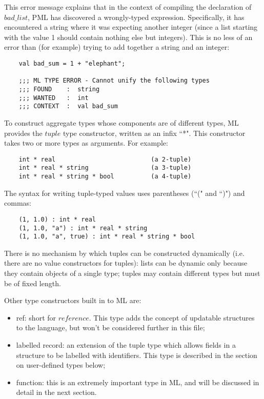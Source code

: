 This error message explains that in the context of compiling the
declaration of $bad\_list$, PML has discovered a wrongly-typed
expression. Specifically, it has encountered a string where it was
expecting another integer (since a list starting with the value 1 should
contain nothing else but integers). This is no less of an error than
(for example) trying to add together a string and an integer:
\begin{verbatim}
    val bad_sum = 1 + "elephant";

    ;;; ML TYPE ERROR - Cannot unify the following types
    ;;; FOUND    :  string
    ;;; WANTED   :  int
    ;;; CONTEXT  :  val bad_sum
\end{verbatim}

To construct aggregate types whose components are of different types, ML
provides the $tuple$ type constructor, written as an infix ``*". This
constructor takes two or more types as arguments. For example:
\begin{verbatim}
    int * real                          (a 2-tuple)
    int * real * string                 (a 3-tuple)
    int * real * string * bool          (a 4-tuple)
\end{verbatim}

The syntax for writing tuple-typed values uses parentheses (``(" and ``)")
and commas:
\begin{verbatim}
    (1, 1.0) : int * real
    (1, 1.0, "a") : int * real * string
    (1, 1.0, "a", true) : int * real * string * bool
\end{verbatim}

There is no mechanism by which tuples can be constructed dynamically
(i.e. there are no value constructors for tuples): lists can be dynamic
only because they contain objects of a single type; tuples may contain
different types but must be of fixed length.

Other type constructors built in to ML are:
\begin{itemize}
\item    ref:
        short for $reference$. This type adds the concept of updatable
        structures to the language, but won't be considered further in
        this file;

\item    labelled record:
        an extension of the tuple type which allows fields in a
        structure to be labelled with identifiers. This type is
        described in the section on user-defined types below;

\item    function:
        this is an extremely important type in ML, and will be discussed
        in detail in the next section.

\end{itemize}

